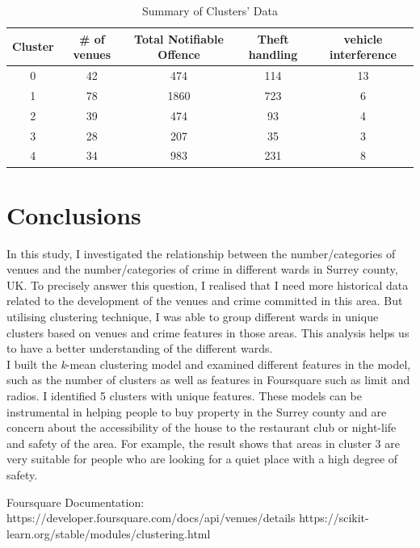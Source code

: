 \documentclass[12pt]{article}
\begin{document}
 \begin{table}[ht]
\caption{Summary of Clusters' Data} %
\centering %
\begin{tabular}{c c c c c } %
\hline\hline %
Cluster & \# of venues & Total Notifiable Offence &  Theft handling& vehicle interference  \\ [0.5ex] %
\hline %
0 &  42  &  474 &  114& 13\\ %
1 &78 & 1860 & 723&6\\
2 & 39  & 474 &  93&4\\
3 &  28 & 207 &35&3 \\
4 &  34 & 983 & 231&8\\ [1ex] %
\hline %
\end{tabular}
\label{tb:SummaryofClusters} %
\end{table}

\section{Conclusions}\label{conclusions}
 In this study, I investigated the relationship between the number/categories of venues and the number/categories of crime in different wards in Surrey county, UK. To precisely answer this question, I realised that I need more historical data related to the development of the venues and crime committed in this area. But utilising clustering technique, I was able to group different wards in unique clusters based on venues and crime features in those areas. This analysis helps us to have a better understanding of the different wards. 
\\\indent I built the \emph{k}-mean clustering model and examined different features in the model, such as the number of clusters as well as features in Foursquare such as limit and radios. I identified 5 clusters with unique features. These models can be instrumental in helping people to buy property in the Surrey county and are concern about the accessibility of the house to the restaurant club or night-life and safety of the area. For example, the result shows that areas in cluster 3 are very suitable for people who are looking for a quiet place with a high degree of safety. 




\begin{thebibliography}{1}

\bibitem{}
Foursquare Documentation: https://developer.foursquare.com/docs/api/venues/details
\bibitem{}
https://scikit-learn.org/stable/modules/clustering.html


\end{thebibliography}
\end{document}
